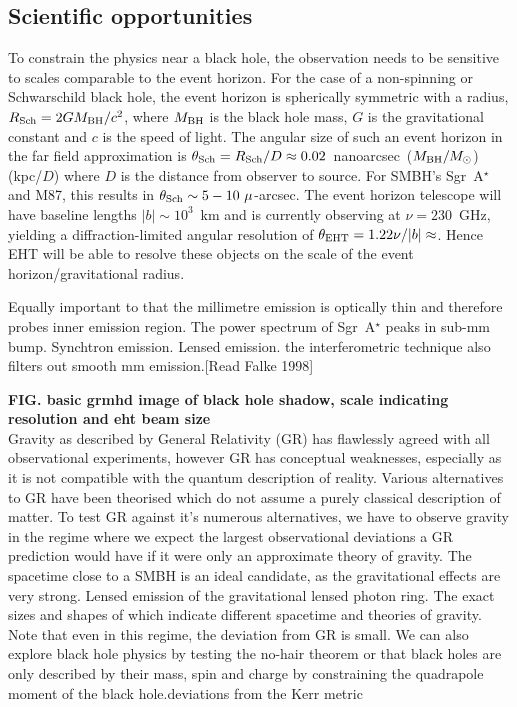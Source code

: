 \subsection{Scientific opportunities}
To constrain the physics near a black hole, the observation needs to be sensitive to scales comparable to the event horizon. For the case of a non-spinning or Schwarschild black hole, the event horizon is spherically symmetric with a radius, $R_{\rm Sch} = 2 G M_{\rm BH} /c^2$,  where $M_{\rm BH}$ is the black hole mass, $G$ is the gravitational constant and $c$ is the speed of light. The angular size of such an event horizon in the far field approximation is $\theta_{\rm Sch} = R_{\rm Sch} / D \approx 0.02$~nanoarcsec~($M_{\rm BH}/M_\odot$)(kpc/$D$) where $D$ is the distance from observer to source. For SMBH's Sgr~A$^\star$ and M87, this results in $\theta_{\rm Sch} \sim 5-10\ \mu$-arcsec. The event horizon telescope will have baseline lengths $|b| \sim 10^3$~km and is currently observing at $\nu =230$~GHz, yielding a diffraction-limited angular resolution of $\theta_{\rm EHT} = 1.22 \nu/ |b| \approx $. Hence EHT will be able to resolve these objects on the scale of the event horizon/gravitational radius. 

Equally important to  that the millimetre emission is optically thin and therefore probes inner emission region. The power spectrum of Sgr~A$^\star$ peaks in sub-mm bump. Synchtron emission. Lensed emission. the interferometric technique also filters out smooth mm emission.[Read Falke 1998]

{\bf FIG. basic grmhd image of black hole shadow, scale indicating resolution and eht beam size}\\


Gravity as described by General Relativity (GR) has flawlessly agreed with all observational experiments, however GR has conceptual weaknesses, especially as it is not compatible with the quantum description of reality. Various alternatives to GR have been theorised which do not assume a purely classical description of matter. To test GR against it's numerous alternatives, we have to observe gravity in the regime where we expect the largest observational deviations a GR prediction would have if it were only an approximate theory of gravity.  The spacetime close to a SMBH is an ideal candidate, as the gravitational effects are very strong. Lensed emission of the gravitational lensed photon ring.  The exact sizes and shapes of which indicate different spacetime and theories of gravity. Note that even in this regime, the deviation from GR is small. We can also explore black hole physics by testing the no-hair theorem or that black holes are only described by their mass, spin and charge by constraining the quadrapole moment of the black hole.deviations
from the Kerr metric

